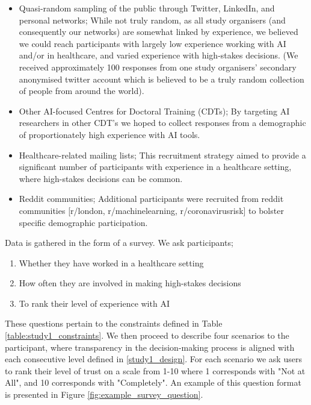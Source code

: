 \documentclass[manuscript,screen,review]{acmart}
\begin{document}
\begin{itemize}
    \item Quasi-random sampling of the public through Twitter, LinkedIn, and personal networks; While not truly random, as all study organisers (and consequently our networks) are somewhat linked by experience, we believed we could reach participants with largely low experience working with AI and/or in healthcare, and varied experience with high-stakes decisions. (We received approximately 100 responses from one study organisers' secondary anonymised twitter account which is believed to be a truly random collection of people from around the world).
    \item Other AI-focused Centres for Doctoral Training (CDTs); By targeting AI researchers in other CDT's we hoped to collect responses from a demographic of proportionately high experience with AI tools.
    \item Healthcare-related mailing lists; This recruitment strategy aimed to provide a significant number of participants with experience in a healthcare setting, where high-stakes decisions can be common.
    \item Reddit communities; Additional participants were recruited from reddit communities [r/london, r/machinelearning, r/coronavirusrisk] to bolster specific demographic participation.
\end{itemize}

Data is gathered in the form of a survey. We ask participants;

\begin{enumerate}
    \item Whether they have worked in a healthcare setting
    \item How often they are involved in making high-stakes decisions
    \item To rank their level of experience with AI
\end{enumerate}

These questions pertain to the constraints defined in Table \ref{table:study1_constraints}. We then proceed to describe four scenarios to the participant, where transparency in the decision-making process is aligned with each consecutive level defined in \ref{study1_design}. For each scenario we ask users to rank their level of trust on a scale from 1-10 where 1 corresponds with "Not at All", and 10 corresponds with "Completely". An example of this question format is presented in Figure \ref{fig:example_survey_question}.
\end{document}
